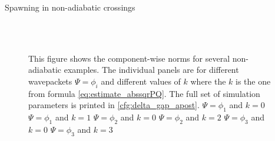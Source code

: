 \begin{chapter}{Spawning in non-adiabatic crossings}
\begin{figure}[h!]
{  } \\
   \\
  \caption[The norms for several non-adiabatic examples]{
  This figure shows the component-wise norms for several non-adiabatic examples.
  The individual panels are for different wavepackets $\Psi = \phi_i$ and different
  values of $k$ where the $k$ is the one from formula \eqref{eq:estimate_abssqrPQ}.
  The full set of simulation parameters is printed in \ref{cfg:delta_gap_apost}.
   $\Psi = \phi_1$ and $k=0$
   $\Psi = \phi_1$ and $k=1$
   $\Psi = \phi_2$ and $k=0$
   $\Psi = \phi_2$ and $k=2$
   $\Psi = \phi_3$ and $k=0$
   $\Psi = \phi_3$ and $k=3$
  \label{fig:spawn_delta_gap_norms1}
  }
\end{figure}



\end{chapter}
